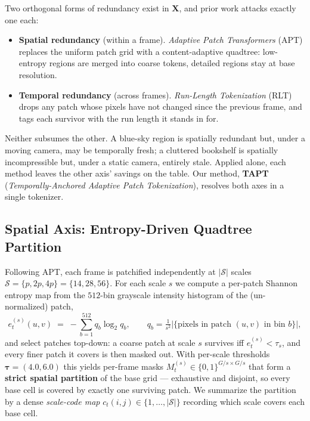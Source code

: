 Two orthogonal forms of redundancy exist in $\mathbf{X}$, and prior work attacks
exactly one each:

\begin{itemize}
  \item \textbf{Spatial redundancy} (within a frame). \emph{Adaptive Patch
    Transformers} (APT) \cite{apt} replaces the uniform patch grid with a
    content-adaptive quadtree: low-entropy regions are merged into coarse
    tokens, detailed regions stay at base resolution.
  \item \textbf{Temporal redundancy} (across frames). \emph{Run-Length
    Tokenization} (RLT) \cite{rlt} drops any patch whose pixels have not changed
    since the previous frame, and tags each survivor with the run length it
    stands in for.
\end{itemize}

Neither subsumes the other. A blue-sky region is spatially redundant but, under
a moving camera, may be temporally fresh; a cluttered bookshelf is spatially
incompressible but, under a static camera, entirely stale. Applied alone, each
method leaves the other axis' savings on the table. Our method, \textbf{TAPT}
(\emph{Temporally-Anchored Adaptive Patch Tokenization}), resolves both axes in a
single tokenizer.

\subsection{Spatial Axis: Entropy-Driven Quadtree Partition}
\label{sec:apt}

Following APT, each frame is patchified independently at $|\mathcal{S}|$ scales
$\mathcal{S} = \{p, 2p, 4p\} = \{14, 28, 56\}$. For each scale $s$ we compute a
per-patch Shannon entropy map from the $512$-bin grayscale intensity histogram of
the (un-normalized) patch,
\begin{equation}
  e^{(s)}_t(u,v) \;=\; -\sum_{b=1}^{512} q_b \log_2 q_b ,
  \qquad q_b = \tfrac{1}{s^2}\big|\{\text{pixels in patch } (u,v) \text{ in bin } b\}\big| ,
\end{equation}
and select patches top-down: a coarse patch at scale $s$ survives iff
$e^{(s)}_t < \tau_s$, and every finer patch it covers is then masked out. With
per-scale thresholds $\bm{\tau} = (4.0, 6.0)$ this yields per-frame masks
$M^{(s)}_t \in \{0,1\}^{G/s \times G/s}$ that form a \textbf{strict spatial
partition} of the base grid --- exhaustive and disjoint, so every base cell is
covered by exactly one surviving patch. We summarize the partition by a dense
\emph{scale-code map} $c_t(i,j) \in \{1,\dots,|\mathcal{S}|\}$ recording which
scale covers each base cell.

